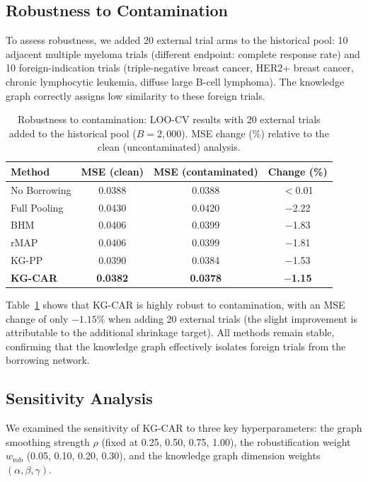 \documentclass[12pt]{article}
\begin{document}
\subsection{Robustness to Contamination}
\label{sec:contamination}

To assess robustness, we added 20 external trial arms to the historical pool: 10 adjacent multiple myeloma trials (different endpoint: complete response rate) and 10 foreign-indication trials (triple-negative breast cancer, HER2+ breast cancer, chronic lymphocytic leukemia, diffuse large B-cell lymphoma). The knowledge graph correctly assigns low similarity to these foreign trials.

\begin{table}[ht]
\centering
\caption{Robustness to contamination: LOO-CV results with 20 external trials added to the historical pool ($B = 2{,}000$). MSE change (\%) relative to the clean (uncontaminated) analysis.}
\label{tab:robustness}
\begin{tabular}{lccc}
\toprule
Method & MSE (clean) & MSE (contaminated) & Change (\%) \\
\midrule
No Borrowing & 0.0388 & 0.0388 & $<$0.01 \\
Full Pooling & 0.0430 & 0.0420 & $-$2.22 \\
BHM & 0.0406 & 0.0399 & $-$1.83 \\
rMAP & 0.0406 & 0.0399 & $-$1.81 \\
KG-PP & 0.0390 & 0.0384 & $-$1.53 \\
\textbf{KG-CAR} & \textbf{0.0382} & \textbf{0.0378} & \textbf{$-$1.15} \\
\bottomrule
\end{tabular}
\end{table}

Table~\ref{tab:robustness} shows that KG-CAR is highly robust to contamination, with an MSE change of only $-1.15\%$ when adding 20 external trials (the slight improvement is attributable to the additional shrinkage target). All methods remain stable, confirming that the knowledge graph effectively isolates foreign trials from the borrowing network. %

\subsection{Sensitivity Analysis}
\label{sec:sensitivity}

We examined the sensitivity of KG-CAR to three key hyperparameters: the graph smoothing strength $\rho$ (fixed at 0.25, 0.50, 0.75, 1.00), the robustification weight $w_{\text{rob}}$ (0.05, 0.10, 0.20, 0.30), and the knowledge graph dimension weights $(\alpha, \beta, \gamma)$.
\end{document}

